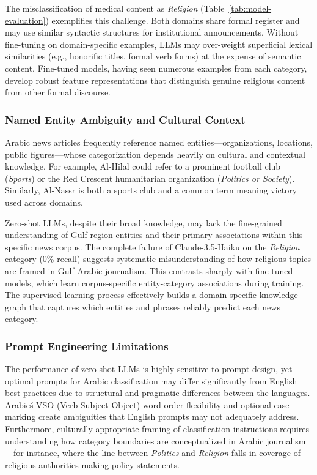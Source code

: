 \documentclass[preprint,12pt,authoryear]{elsarticle}
\begin{document}
The misclassification of medical content as \textit{Religion} (Table~\ref{tab:model-evaluation}) exemplifies this challenge. Both domains share formal register and may use similar syntactic structures for institutional announcements. Without fine-tuning on domain-specific examples, LLMs may over-weight superficial lexical similarities (e.g., honorific titles, formal verb forms) at the expense of semantic content. Fine-tuned models, having seen numerous examples from each category, develop robust feature representations that distinguish genuine religious content from other formal discourse.

\subsubsection{Named Entity Ambiguity and Cultural Context}

Arabic news articles frequently reference named entities---organizations, locations, public figures---whose categorization depends heavily on cultural and contextual knowledge. For example, Al-Hilal could refer to a prominent football club (\textit{Sports}) or the Red Crescent humanitarian organization (\textit{Politics or Society}). Similarly, Al-Nassr is both a sports club and a common term meaning victory used across domains.

Zero-shot LLMs, despite their broad knowledge, may lack the fine-grained understanding of Gulf region entities and their primary associations within this specific news corpus. The complete failure of Claude-3.5-Haiku on the \textit{Religion} category (0\% recall) suggests systematic misunderstanding of how religious topics are framed in Gulf Arabic journalism. This contrasts sharply with fine-tuned models, which learn corpus-specific entity-category associations during training. The supervised learning process effectively builds a domain-specific knowledge graph that captures which entities and phrases reliably predict each news category.

\subsubsection{Prompt Engineering Limitations}

The performance of zero-shot LLMs is highly sensitive to prompt design, yet optimal prompts for Arabic classification may differ significantly from English best practices due to structural and pragmatic differences between the languages. Arabic\'s VSO (Verb-Subject-Object) word order flexibility and optional case marking create ambiguities that English prompts may not adequately address. Furthermore, culturally appropriate framing of classification instructions requires understanding how category boundaries are conceptualized in Arabic journalism---for instance, where the line between \textit{Politics} and \textit{Religion} falls in coverage of religious authorities making policy statements.
\end{document}
